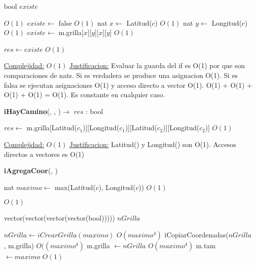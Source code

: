 \begin{Algoritmos}
\begin{algorithm}[H]
\begin{algorithmic}[1]
\State bool $existe$

 \Comment $O(1)$
	\State $existe \gets$ false \Comment $O(1)$
\Else
	\State nat $x \gets$ Latitud($c$) \Comment $O(1)$
	\State nat $y \gets$ Longitud($c$) \Comment $O(1)$
	\State $existe \gets$ m.grilla[$x$][$y$][$x$][$y$] \Comment $O(1)$
\EndIf

\State $res \gets existe$ \Comment $O(1)$

\medskip
\Statex \underline{Complejidad:} $O(1)$
\Statex \underline{Justificacion:} Evaluar la guarda del if es O(1) por que son comparaciones de nats. Si es verdadera se produce una asignacion O(1). Si es falsa se ejecutan asignaciones O(1) y acceso directo a vector O(1). O(1) + O(1) + O(1) + O(1) = O(1). Es constante en cualquier caso.

\end{algorithmic}
\end{algorithm}


\begin{algorithm}[H]
{\textbf{iHayCamino}(, , )$\to$ $res$ : bool}
\begin{algorithmic}[1]

\State $res \gets$ m.grilla[Latitud($c_1$)][Longitud($c_1$)][Latitud($c_2$)][Longitud($c_2$)] \Comment $O(1)$

\medskip
\Statex \underline{Complejidad:} $O(1)$
\Statex \underline{Justificacion:} Latitud() y Longitud() son O(1). Accesos directos a vectores es O(1)

\end{algorithmic}
\end{algorithm}




{\textbf{iAgregaCoor}(, )}
\begin{algorithmic}[1]

\State nat $maximo \gets$ max(Latitud($c$), Longitud($c$))  \Comment $O(1)$

\State {} \Comment $O(1)$

\State vector(vector(vector(vector(bool))))) $nGrilla$

\State $nGrilla \gets iCrearGrilla(maximo)$ \Comment $O(maximo^4)$
\State iCopiarCoordenadas($nGrilla$, m.grilla) \Comment $O((maximo^4)$
\State m.grilla $\gets nGrilla$ \Comment $O(maximo^4)$
\State m.tam $\gets maximo$ \Comment $O(1)$


\end{algorithmic}
\end{Algoritmos}
